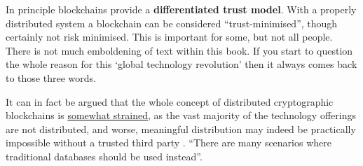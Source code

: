 In principle blockchains provide a \textbf{differentiated trust model}. With a properly distributed system a blockchain can be considered ``trust-minimised'', though certainly not risk minimised. This is important for some, but not all people. There is not much emboldening of text within this book. If you start to question the whole reason for this `global technology revolution' then it always comes back to those three words. \par
It can in fact be argued that the whole concept of distributed cryptographic blockchains is \href{https://www.trailofbits.com/reports/Unintended_Centralities_in_Distributed_Ledgers.pdf}{somewhat strained}, as the vast majority of the technology offerings are not distributed, and worse, meaningful distribution may indeed be practically impossible without a trusted third party \cite{kwon2019impossibility}. ``There are many scenarios where traditional databases should be used instead''\cite{casino2019systematic}.\par
